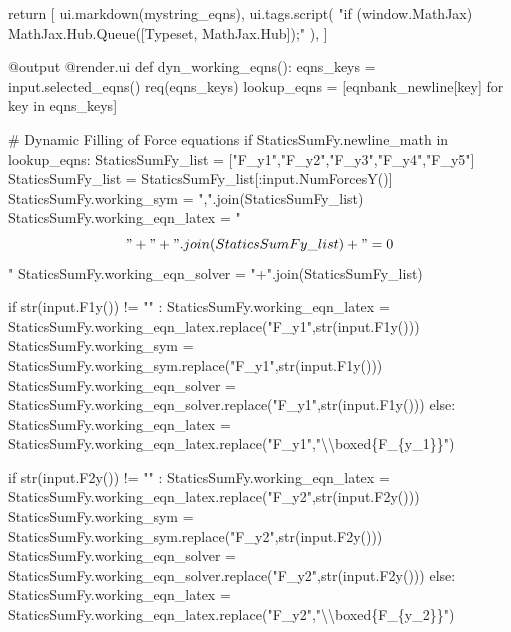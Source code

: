 \documentclass[
  letterpaper,
  DIV=11,
  numbers=noendperiod]{scrreprt}
\newenvironment{Shaded}{\begin{snugshade}}{\end{snugshade}}
\newcommand{\NormalTok}[1]{\textcolor[rgb]{0.00,0.23,0.31}{#1}}
\begin{document}
\begin{Shaded}
\begin{Highlighting}[]
\NormalTok{        return [}
\NormalTok{            ui.markdown(mystring\_eqns),}
\NormalTok{            ui.tags.script(}
\NormalTok{                "if (window.MathJax) MathJax.Hub.Queue([\textquotesingle{}Typeset\textquotesingle{}, MathJax.Hub]);"}
\NormalTok{            ),}
\NormalTok{        ]}

\NormalTok{    @output}
\NormalTok{    @render.ui}
\NormalTok{    def dyn\_working\_eqns():}
\NormalTok{        eqns\_keys = input.selected\_eqns()}
\NormalTok{        req(eqns\_keys)}
\NormalTok{        lookup\_eqns = [eqnbank\_newline[key] for key in eqns\_keys]}
        

\NormalTok{        \# Dynamic Filling of Force equations }
\NormalTok{        if StaticsSumFy.newline\_math in lookup\_eqns:}
\NormalTok{            StaticsSumFy\_list = ["F\_y1","F\_y2","F\_y3","F\_y4","F\_y5"]}
\NormalTok{            StaticsSumFy\_list = StaticsSumFy\_list[:input.NumForcesY()]}
\NormalTok{            StaticsSumFy.working\_sym = ",".join(StaticsSumFy\_list)}
\NormalTok{            StaticsSumFy.working\_eqn\_latex = "$$" + "+".join(StaticsSumFy\_list) + "=0$$"}
\NormalTok{            StaticsSumFy.working\_eqn\_solver = "+".join(StaticsSumFy\_list)}
            
\NormalTok{            if str(input.F1y()) != "" : }
\NormalTok{                StaticsSumFy.working\_eqn\_latex = StaticsSumFy.working\_eqn\_latex.replace("F\_y1",str(input.F1y()))}
\NormalTok{                StaticsSumFy.working\_sym = StaticsSumFy.working\_sym.replace("F\_y1",str(input.F1y()))}
\NormalTok{                StaticsSumFy.working\_eqn\_solver = StaticsSumFy.working\_eqn\_solver.replace("F\_y1",str(input.F1y()))}
\NormalTok{            else:}
\NormalTok{                StaticsSumFy.working\_eqn\_latex = StaticsSumFy.working\_eqn\_latex.replace("F\_y1","\textbackslash{}\textbackslash{}boxed\{F\_\{y\_1\}\}")}
        
\NormalTok{            if str(input.F2y()) != "" : }
\NormalTok{                StaticsSumFy.working\_eqn\_latex = StaticsSumFy.working\_eqn\_latex.replace("F\_y2",str(input.F2y()))}
\NormalTok{                StaticsSumFy.working\_sym = StaticsSumFy.working\_sym.replace("F\_y2",str(input.F2y()))}
\NormalTok{                StaticsSumFy.working\_eqn\_solver = StaticsSumFy.working\_eqn\_solver.replace("F\_y2",str(input.F2y()))}
\NormalTok{            else:}
\NormalTok{                StaticsSumFy.working\_eqn\_latex = StaticsSumFy.working\_eqn\_latex.replace("F\_y2","\textbackslash{}\textbackslash{}boxed\{F\_\{y\_2\}\}")}
        

\end{Highlighting}
\end{Shaded}
\end{document}
